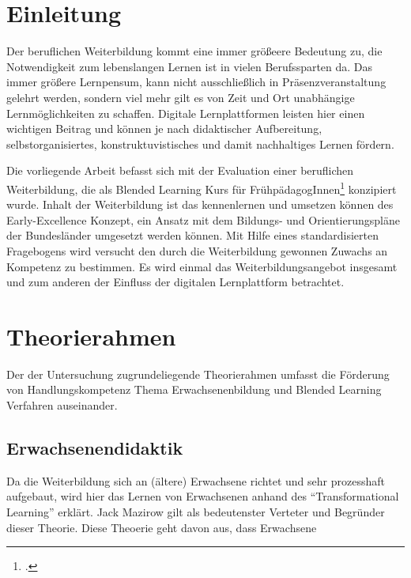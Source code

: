 \documentclass[12pt, bibliography=totoc]{scrartcl}
\begin{document}
%
\tableofcontents
\setcounter{page}{1}
\pagebreak

\section{Einleitung}\label{einleitung}

Der beruflichen Weiterbildung kommt eine immer größeere Bedeutung zu,
die Notwendigkeit zum lebenslangen Lernen ist in vielen Berufssparten
da. Das immer größere Lernpensum, kann nicht ausschließlich in
Präsenzveranstaltung gelehrt werden, sondern viel mehr gilt es von Zeit
und Ort unabhängige Lernmöglichkeiten zu schaffen. Digitale
Lernplattformen leisten hier einen wichtigen Beitrag und können je nach
didaktischer Aufbereitung, selbstorganisiertes, konstruktuvistisches und
damit nachhaltiges Lernen fördern.

Die vorliegende Arbeit befasst sich mit der Evaluation einer beruflichen
Weiterbildung, die als Blended Learning Kurs für
FrühpädagogInnen\footcite{Der Begriffe FrühpädagogInnen, schließt alle im Kitabereich tätigen Fachkräfte ein}
konzipiert wurde. Inhalt der Weiterbildung ist das kennenlernen und
umsetzen können des Early-Excellence Konzept, ein Ansatz mit dem
Bildungs- und Orientierungspläne der Bundesländer umgesetzt werden
können. Mit Hilfe eines standardisierten Fragebogens wird versucht den
durch die Weiterbildung gewonnen Zuwachs an Kompetenz zu bestimmen. Es
wird einmal das Weiterbildungsangebot insgesamt und zum anderen der
Einfluss der digitalen Lernplattform betrachtet.

\section{Theorierahmen}\label{theorierahmen}

Der der Untersuchung zugrundeliegende Theorierahmen umfasst die
Förderung von Handlungskompetenz Thema Erwachsenenbildung
 und Blended Learning Verfahren
auseinander.

\subsection{Erwachsenendidaktik}\label{erwachsenendidaktik}

Da die Weiterbildung sich an (ältere) Erwachsene richtet und sehr
prozesshaft aufgebaut, wird hier das Lernen von Erwachsenen anhand des
\enquote{Transformational Learning} erklärt. Jack Mazirow gilt als
bedeutenster Verteter und Begründer dieser Theorie. Diese Theoerie geht
davon aus, dass Erwachsene
\end{document}
